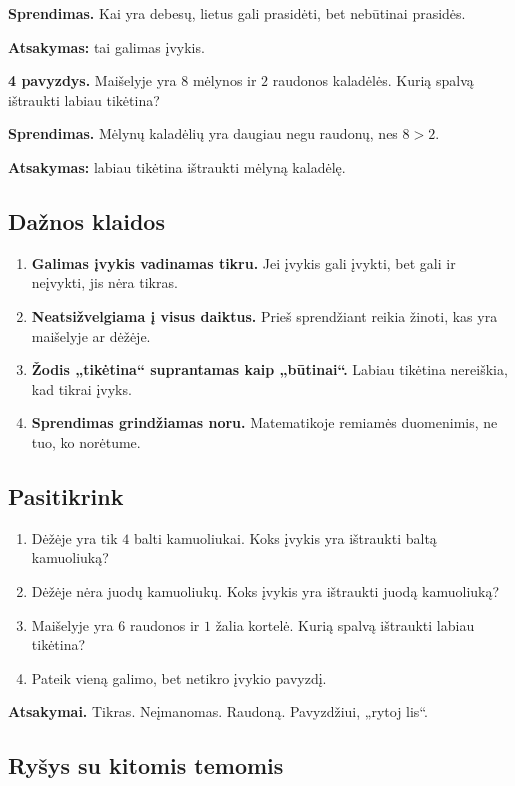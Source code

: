 \textbf{Sprendimas.} Kai yra debesų, lietus gali prasidėti, bet nebūtinai prasidės.

\textbf{Atsakymas:} tai galimas įvykis.

\textbf{4 pavyzdys.} Maišelyje yra \(8\) mėlynos ir \(2\) raudonos kaladėlės. Kurią spalvą ištraukti labiau tikėtina?

\textbf{Sprendimas.} Mėlynų kaladėlių yra daugiau negu raudonų, nes \(8>2\).

\textbf{Atsakymas:} labiau tikėtina ištraukti mėlyną kaladėlę.

\subsection{Dažnos klaidos}

\begin{enumerate}
\item \textbf{Galimas įvykis vadinamas tikru.} Jei įvykis gali įvykti, bet gali ir neįvykti, jis nėra tikras.
\item \textbf{Neatsižvelgiama į visus daiktus.} Prieš sprendžiant reikia žinoti, kas yra maišelyje ar dėžėje.
\item \textbf{Žodis „tikėtina“ suprantamas kaip „būtinai“.} Labiau tikėtina nereiškia, kad tikrai įvyks.
\item \textbf{Sprendimas grindžiamas noru.} Matematikoje remiamės duomenimis, ne tuo, ko norėtume.
\end{enumerate}

\subsection{Pasitikrink}

\begin{enumerate}
\item Dėžėje yra tik \(4\) balti kamuoliukai. Koks įvykis yra ištraukti baltą kamuoliuką?
\item Dėžėje nėra juodų kamuoliukų. Koks įvykis yra ištraukti juodą kamuoliuką?
\item Maišelyje yra \(6\) raudonos ir \(1\) žalia kortelė. Kurią spalvą ištraukti labiau tikėtina?
\item Pateik vieną galimo, bet netikro įvykio pavyzdį.
\end{enumerate}

\textbf{Atsakymai.} Tikras. Neįmanomas. Raudoną. Pavyzdžiui, „rytoj lis“.

\subsection{Ryšys su kitomis temomis}

